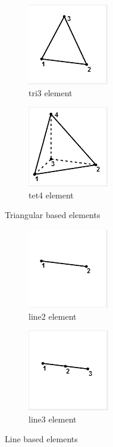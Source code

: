 \begin{figure}[!h]
\centering
\begin{subfigure}{.5\textwidth}
  \centering
  \includegraphics[width=0.3\linewidth]{../Graphics/LISA-tri3.png}
  \caption{tri3 element}
  \label{fig:sub1}
\end{subfigure}%
\begin{subfigure}{.5\textwidth}
  \centering
  \includegraphics[width=0.3\linewidth]{../Graphics/LISA-tet4.png}
  \caption{tet4 element}
  \label{fig:sub2}
\end{subfigure}
\label{fig:test}
\caption{Triangular based elements}
\end{figure}


\begin{figure}[ht]
\centering
\begin{subfigure}{.5\textwidth}
  \centering
  \includegraphics[width=0.3\linewidth]{../Graphics/LISA-line2.png}
  \caption{line2 element}
  \label{fig:sub1}
\end{subfigure}%
\begin{subfigure}{.5\textwidth}
  \centering
  \includegraphics[width=0.3\linewidth]{../Graphics/LISA-line3.png}
  \caption{line3 element}
  \label{fig:sub2}
\end{subfigure}
\label{fig:test}
\caption{Line based elements}
\end{figure} 

